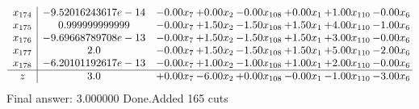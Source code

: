 \documentclass[8pt]{article}
\begin{document}
\[\begin{array}{c| c c@{\hskip 2pt} c@{\hskip 2pt} c@{\hskip 2pt} c@{\hskip 2pt} c@{\hskip 2pt} c@{\hskip 2pt} }
 x_{174}   &  -9.52016243617e-14 & -0.00 x_{7} & +  0.00 x_{2} & -0.00 x_{108} & +  0.00 x_{1} & +  1.00 x_{110} & -0.00 x_{6}\\
 x_{175}   &  0.999999999999 & -0.00 x_{7} & +  1.50 x_{2} & -1.50 x_{108} & +  1.50 x_{1} & +  4.00 x_{110} & -1.00 x_{6}\\
 x_{176}   &  -9.69668789708e-13 & -0.00 x_{7} & +  1.50 x_{2} & -1.50 x_{108} & +  1.50 x_{1} & +  3.00 x_{110} & -0.00 x_{6}\\
 x_{177}   &  2.0 & -0.00 x_{7} & +  1.50 x_{2} & -1.50 x_{108} & +  1.50 x_{1} & +  5.00 x_{110} & -2.00 x_{6}\\
 x_{178}   &  -6.20101192617e-13 & -0.00 x_{7} & +  1.00 x_{2} & -1.00 x_{108} & +  1.00 x_{1} & +  2.00 x_{110} & -0.00 x_{6}\\
\hline
z    &  3.0 & +  0.00 x_{7} & -6.00 x_{2} & +  0.00 x_{108} & -0.00 x_{1} & -1.00 x_{110} & -3.00 x_{6}\\
\end{array}\]
 Final answer: 3.000000 
Done.Added 165 cuts 
\end{document}
